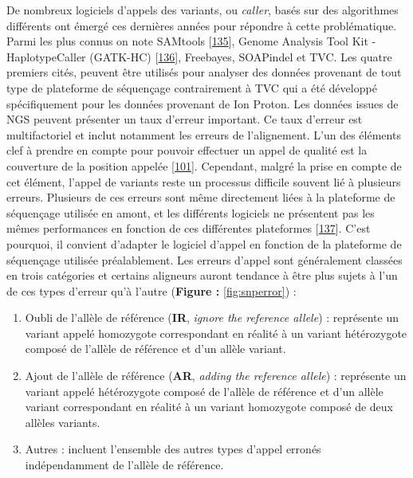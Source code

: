 \documentclass[12pt,twoside]{ugathesis}
\theoremstyle{definition}
\theoremstyle{definition}
\theoremstyle{remark}
\begin{document}
De nombreux logiciels d'appels des variants, ou \emph{caller}, basés sur
des algorithmes différents ont émergé ces dernières années pour répondre
à cette problématique. Parmi les plus connus on note SAMtools
{[}\protect\hyperlink{ref-Li2009}{135}{]}, Genome Analysis Tool Kit -
HaplotypeCaller (GATK-HC)
{[}\protect\hyperlink{ref-McKenna2010}{136}{]}, Freebayes, SOAPindel et
TVC. Les quatre premiers cités, peuvent être utilisés pour analyser des
données provenant de tout type de plateforme de séquençage contrairement
à TVC qui a été développé spécifiquement pour les données provenant de
Ion Proton. Les données issues de NGS peuvent présenter un taux d'erreur
important. Ce taux d'erreur est multifactoriel et inclut notamment les
erreurs de l'alignement. L'un des éléments clef à prendre en compte pour
pouvoir effectuer un appel de qualité est la couverture de la position
appelée {[}\protect\hyperlink{ref-Sims2014}{101}{]}. Cependant, malgré
la prise en compte de cet élément, l'appel de variants reste un
processus difficile souvent lié à plusieurs erreurs. Plusieurs de ces
erreurs sont même directement liées à la plateforme de séquençage
utilisée en amont, et les différents logiciels ne présentent pas les
mêmes performances en fonction de ces différentes plateformes
{[}\protect\hyperlink{ref-Hwang2015}{137}{]}. C'est pourquoi, il
convient d'adapter le logiciel d'appel en fonction de la plateforme de
séquençage utilisée préalablement. Les erreurs d'appel sont généralement
classées en trois catégories et certains aligneurs auront tendance à
être plus sujets à l'un de ces types d'erreur qu'à l'autre
(\textbf{Figure : }\ref{fig:snperror}) :

\begin{enumerate}
\def\labelenumi{\arabic{enumi}.}
\item
  Oubli de l'allèle de référence (\textbf{IR}, \emph{ignore the
  reference allele}) : représente un variant appelé homozygote
  correspondant en réalité à un variant hétérozygote composé de l'allèle
  de référence et d'un allèle variant.
\item
  Ajout de l'allèle de référence (\textbf{AR}, \emph{adding the
  reference allele}) : représente un variant appelé hétérozygote composé
  de l'allèle de référence et d'un allèle variant correspondant en
  réalité à un variant homozygote composé de deux allèles variants.
\item
  Autres : incluent l'ensemble des autres types d'appel erronés
  indépendamment de l'allèle de référence.
\end{enumerate}
\end{document}
